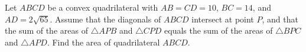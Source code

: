Let $ABCD$ be a convex quadrilateral with $AB=CD=10$,  $BC=14$,  and $AD=2\sqrt{65}$.  Assume that the diagonals of $ABCD$ intersect at point $P$,  and that the sum of the areas of $\triangle APB$ and $\triangle CPD$ equals the sum of the areas of $\triangle BPC$ and $\triangle APD$.  Find the area of quadrilateral $ABCD$.